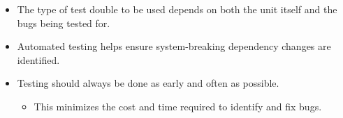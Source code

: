\documentclass{article}
\begin{document}
\begin{itemize}
\begin{enumerate}
\begin{itemize}
		\end{itemize}
		\item Mocks
		\begin{itemize}
			\item A minimal implementation of the dependency the unit relies on.
		\end{itemize}
	\end{enumerate}
	\item The type of test double to be used depends on both the unit itself and the bugs being tested for.
	\item Automated testing helps ensure system-breaking dependency changes are identified.
	\item Testing should always be done as early and often as possible.
	\begin{itemize}
		\item This minimizes the cost and time required to identify and fix bugs.
	\end{itemize}
\end{itemize}

\ifdefined\iscombined
	\newpage
\else
	
\end{document}

